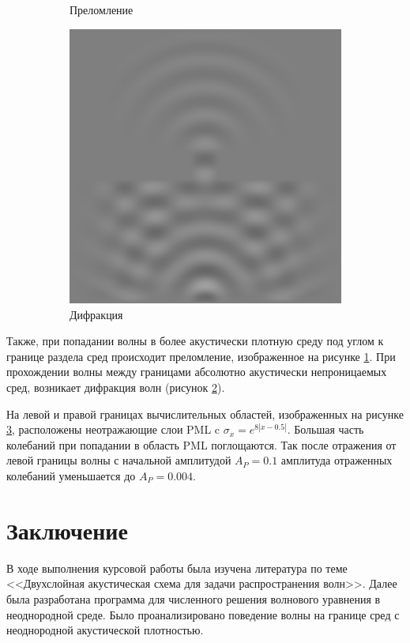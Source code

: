 \documentclass[a4paper, fontsize=14pt]{article}
\begin{document}
\begin{figure}[h]
\begin{subfigure}{0.3\textwidth}
		\caption{Преломление}
		\label{wrefr}
	\end{subfigure}
	\begin{subfigure}{0.3\textwidth}
		\centering
		\includegraphics[width=\textwidth]{difr.eps}
		\caption{Дифракция}
		\label{wdifr}
	\end{subfigure}
    \caption{}
    \label{wphenomena}
\end{figure}

Также, при попадании волны в более акустически плотную среду под углом к границе раздела сред происходит
преломление, изображенное на рисунке \ref{wrefr}. При прохождении волны между границами абсолютно
акустически непроницаемых сред, возникает дифракция волн (рисунок \ref{wdifr}). 

На левой и правой границах вычислительных областей, изображенных на рисунке \ref{wphenomena}, 
расположены неотражающие слои PML c $\sigma_x = e^{8 |x-0.5|}$. Большая часть колебаний при попадании в область PML поглощаются.
Так после отражения от левой границы волны с начальной амплитудой $A_P = 0.1$ амплитуда отраженных
колебаний уменьшается до  $A_P = 0.004$.
\newpage
\section*{Заключение}
В ходе выполнения курсовой работы была изучена литература по теме <<Двухслойная акустическая схема
для задачи распространения волн>>. Далее была разработана программа для численного решения волнового
уравнения в неоднородной среде. Было проанализировано поведение волны на границе сред с неоднородной
акустической плотностью.
\end{document}
